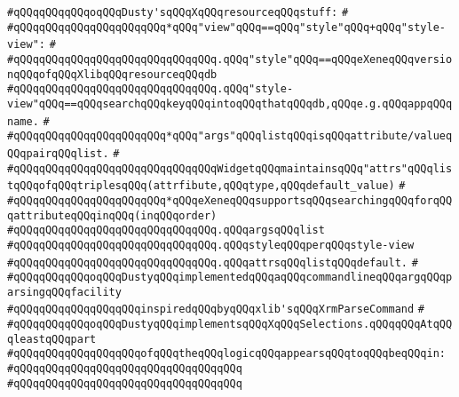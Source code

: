 \verb|#qQQqqQQqqQQqoqQQqDusty'sqQQqXqQQqresourceqQQqstuff:|\newline
\verb|#|\newline
\verb|#qQQqqQQqqQQqqQQqqQQqqQQq*qQQq"view"qQQq==qQQq"style"qQQq+qQQq"style-view":|\newline
\verb|#|\newline
\verb|#qQQqqQQqqQQqqQQqqQQqqQQqqQQqqQQq.qQQq"style"qQQq==qQQqeXeneqQQqversionqQQqofqQQqXlibqQQqresourceqQQqdb|\newline
\verb|#qQQqqQQqqQQqqQQqqQQqqQQqqQQqqQQq.qQQq"style-view"qQQq==qQQqsearchqQQqkeyqQQqintoqQQqthatqQQqdb,qQQqe.g.qQQqappqQQqname.|\newline
\verb|#|\newline
\verb|#qQQqqQQqqQQqqQQqqQQqqQQq*qQQq"args"qQQqlistqQQqisqQQqattribute/valueqQQqpairqQQqlist.|\newline
\verb|#|\newline
\verb|#qQQqqQQqqQQqqQQqqQQqqQQqqQQqqQQqWidgetqQQqmaintainsqQQq"attrs"qQQqlistqQQqofqQQqtriplesqQQq(attrfibute,qQQqtype,qQQqdefault_value)|\newline
\verb|#|\newline
\verb|#qQQqqQQqqQQqqQQqqQQqqQQq*qQQqeXeneqQQqsupportsqQQqsearchingqQQqforqQQqattributeqQQqinqQQq(inqQQqorder)|\newline
\verb|#qQQqqQQqqQQqqQQqqQQqqQQqqQQqqQQq.qQQqargsqQQqlist|\newline
\verb|#qQQqqQQqqQQqqQQqqQQqqQQqqQQqqQQq.qQQqstyleqQQqperqQQqstyle-view|\newline
\verb|#qQQqqQQqqQQqqQQqqQQqqQQqqQQqqQQq.qQQqattrsqQQqlistqQQqdefault.|\newline
\verb|#|\newline
\verb|#qQQqqQQqqQQqoqQQqDustyqQQqimplementedqQQqaqQQqcommandlineqQQqargqQQqparsingqQQqfacility|\newline
\verb|#qQQqqQQqqQQqqQQqqQQqinspiredqQQqbyqQQqxlib'sqQQqXrmParseCommand|\newline
\verb|#|\newline
\verb|#qQQqqQQqqQQqoqQQqDustyqQQqimplementsqQQqXqQQqSelections.qQQqqQQqAtqQQqleastqQQqpart|\newline
\verb|#qQQqqQQqqQQqqQQqqQQqofqQQqtheqQQqlogicqQQqappearsqQQqtoqQQqbeqQQqin:|\newline
\verb|#qQQqqQQqqQQqqQQqqQQqqQQqqQQqqQQqqQQq|\newline
\verb|#qQQqqQQqqQQqqQQqqQQqqQQqqQQqqQQqqQQq|\newline
